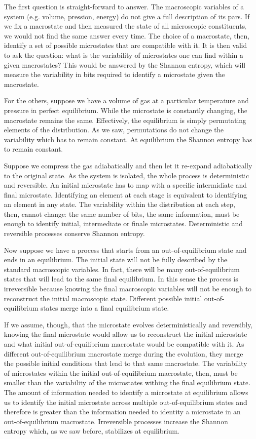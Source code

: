 \documentclass{article}
\begin{document}
The first question is straight-forward to answer. The macroscopic variables of a system (e.g. volume, pression, energy) do not give a full description of its pars. If we fix a macrostate and then measured the state of all microscopic constituents, we would not find the same answer every time. The choice of a macrostate, then, identify a set of possible microstates that are compatible with it. It is then valid to ask the question: what is the variability of microstates one can find within a given macrostates? This would be answered by the Shannon entropy, which will measure the variability in bits required to identify a microstate given the macrostate.

For the others, suppose we have a volume of gas at a particular temperature and pressure in perfect equilibrium. While the microstate is constantly changing, the macrostate remains the same. Effectively, the equilibrium is simply permutating elements of the distribution. As we saw, permutations do not change the variability which has to remain constant. At equilibrium the Shannon entropy has to remain constant.

Suppose we compress the gas adiabatically and then let it re-expand adiabatically to the original state. As the system is isolated, the whole process is deterministic and reversible. An initial microstate has to map with a specific intermidiate and final microstate. Identifying an element at each stage is equivalent to identifying an element in any state. The variability within the distribution at each step, then, cannot change: the same number of bits, the same information, must be enough to identify initial, intermediate or finale microstates. Deterministic and reversible processes conserve Shannon entropy.

Now suppose we have a process that starts from an out-of-equilibrium state and ends in an equilibrium. The initial state will not be fully described by the standard macroscopic variables. In fact, there will be many out-of-equilibrium states that will lead to the same final equilibrium. In this sense the process is irreversible because knowing the final macroscopic variables will not be enough to reconstruct the initial macroscopic state. Different possible initial out-of-equilibrium states merge into a final equilibrium state.

If we assume, though, that the microstate evolves deterministically and reversibly, knowing the final microstate would allow us to reconstruct the initial microstate and what initial out-of-equilibrium macrostate would be compatible with it. As different out-of-equilibrium macrostate merge during the evolution, they merge the possible initial conditions that lead to that same macrostate. The variability of microstates within the initial out-of-equilibrium macrostate, then, must be smaller than the variability of the microstates withing the final equilibrium state. The amount of information needed to identify a microstate at equilibrium allows us to identify the initial microstate across multiple out-of-equilibrium states and therefore is greater than the information needed to identity a microstate in an out-of-equilibrium macrostate. Irreversible processes increase the Shannon entropy which, as we saw before, stabilizes at equilibrium.
\end{document}
